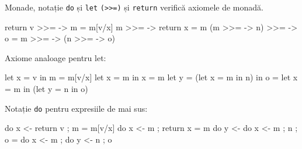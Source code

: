 \documentclass[xcolor=pdftex,romanian,colorlinks]{beamer}
\begin{document}
%
%

%
\begin{frame}[fragile]{Monade, notație \lstinline$do$ și \lstinline$let$}
\lstinline$(>>=)$ și \lstinline$return$ verifică axiomele de monadă.
\begin{asciihs}
  return v >>= \x -> m        =  m[v/x]
  m >>= \x -> return x        =  m
  (m >>= \x -> n) >>= \y-> o  =  m >>= \x -> (n >>= \y -> o)
\end{asciihs}

%
Axiome analoage pentru let:
\begin{asciihs}
   let x = v in m   =   m[v/x]
   let x = m in x   =   m
   let y = (let x = m in n) in o
                    =   let x = m in (let y = n in o)
\end{asciihs}

Notație \lstinline$do$ pentru expresiile de mai sus:
\begin{asciihs}
  do {x <- return v ; m}         =  m[v/x] 
  do {x <- m ; return x}         =  m
  do {y <- do {x <- m ; n} ; o}  =  do {x <- m ; 
                                        do {y <- n ; o}}
\end{asciihs}

\end{frame}
\end{document}
